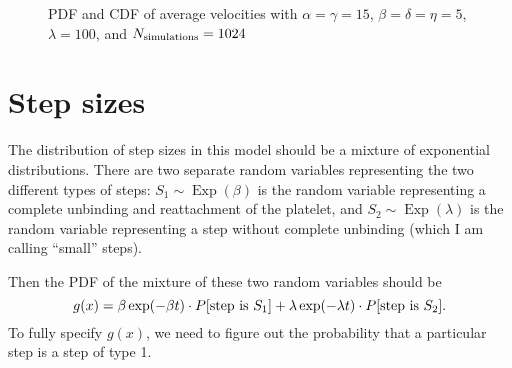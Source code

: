 \documentclass{article}
\newcommand{\tn}{\textnormal}
\DeclareMathOperator{\Exp}{Exp}
\begin{document}
\begin{figure}
  \centering
  \begin{subfigure}{0.48\textwidth}
  \end{subfigure}
  \hfill
  \begin{subfigure}{0.48\textwidth}
  \end{subfigure}
  \caption{PDF and CDF of average velocities with $\alpha = \gamma =
    15$, $\beta = \delta = \eta = 5$, $\lambda = 100$, and
    $N_\tn{simulations} = 1024$}
  \label{fig:exact-cmp-large-a}  
\end{figure}

\section{Step sizes}
\label{sec:step-sizes}

The distribution of step sizes in this model should be a mixture of
exponential distributions. There are two separate random variables
representing the two different types of steps: $S_1 \sim \Exp(\beta)$
is the random variable representing a complete unbinding and
reattachment of the platelet, and $S_2 \sim \Exp(\lambda)$ is the
random variable representing a step without complete unbinding (which
I am calling ``small'' steps).

Then the PDF of the mixture of these two random variables should be
\begin{equation}
  g(x) = \beta \exp(-\beta t) \cdot P[\tn{step is }S_1] + \lambda
  \exp(-\lambda t) \cdot P[\tn{step is }
  S_2]. \label{eq:partially-specified-pdf}
\end{equation}
To fully specify $g(x)$, we need to figure out the probability that a
particular step is a step of type 1.
\end{document}
